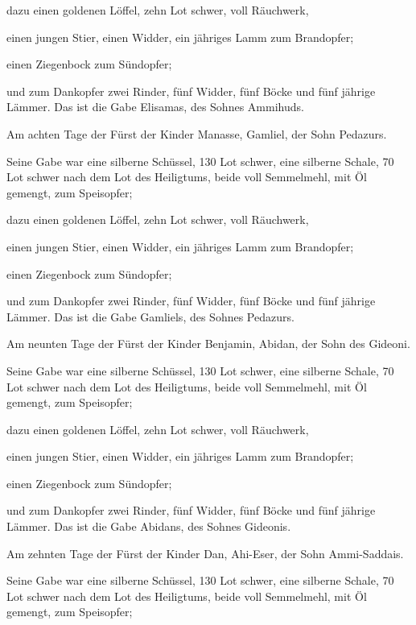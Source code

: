  dazu einen goldenen Löffel, zehn Lot schwer, voll
Räuchwerk,

 einen jungen Stier, einen Widder, ein jähriges Lamm zum
Brandopfer;

 einen Ziegenbock zum Sündopfer;

 und zum Dankopfer zwei Rinder, fünf Widder, fünf Böcke
und fünf jährige Lämmer. Das ist die Gabe Elisamas, des Sohnes Ammihuds.

 Am achten Tage der Fürst der Kinder Manasse, Gamliel,
der Sohn Pedazurs.

 Seine Gabe war eine silberne Schüssel, 130 Lot schwer,
eine silberne Schale, 70 Lot schwer nach dem Lot des Heiligtums, beide
voll Semmelmehl, mit Öl gemengt, zum Speisopfer;

 dazu einen goldenen Löffel, zehn Lot schwer, voll
Räuchwerk,

 einen jungen Stier, einen Widder, ein jähriges Lamm zum
Brandopfer;

 einen Ziegenbock zum Sündopfer;

 und zum Dankopfer zwei Rinder, fünf Widder, fünf Böcke
und fünf jährige Lämmer. Das ist die Gabe Gamliels, des Sohnes Pedazurs.

 Am neunten Tage der Fürst der Kinder Benjamin, Abidan,
der Sohn des Gideoni.

 Seine Gabe war eine silberne Schüssel, 130 Lot schwer,
eine silberne Schale, 70 Lot schwer nach dem Lot des Heiligtums, beide
voll Semmelmehl, mit Öl gemengt, zum Speisopfer;

 dazu einen goldenen Löffel, zehn Lot schwer, voll
Räuchwerk,

 einen jungen Stier, einen Widder, ein jähriges Lamm zum
Brandopfer;

 einen Ziegenbock zum Sündopfer;

 und zum Dankopfer zwei Rinder, fünf Widder, fünf Böcke
und fünf jährige Lämmer. Das ist die Gabe Abidans, des Sohnes Gideonis.

 Am zehnten Tage der Fürst der Kinder Dan, Ahi-Eser, der
Sohn Ammi-Saddais.

 Seine Gabe war eine silberne Schüssel, 130 Lot schwer,
eine silberne Schale, 70 Lot schwer nach dem Lot des Heiligtums, beide
voll Semmelmehl, mit Öl gemengt, zum Speisopfer;

